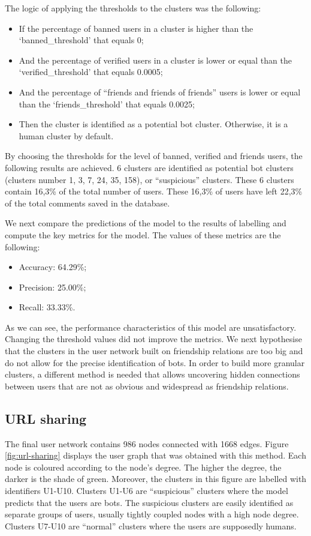 The logic of applying the thresholds to the clusters was the following:
\begin{itemize}
    \item If the percentage of banned users in a cluster is higher than the ‘banned\_threshold’ that equals 0;
    \item And the percentage of verified users in a cluster is lower or equal than
    the ‘verified\_threshold’ that equals 0.0005;
    \item And the percentage of ``friends and friends of friends'' users is lower or equal than the ‘friends\_threshold’ that equals 0.0025;
    \item Then the cluster is identified as a potential bot cluster. Otherwise, it is a human cluster by default.
\end{itemize}

By choosing the thresholds for the level of banned, verified and friends users,
the following results are achieved. 6 clusters are identified as potential bot clusters (clusters number 1, 3, 7, 24, 35, 158), or ``suspicious'' clusters. These 6 clusters contain 16,3\% of the total number of users. These 16,3\% of users have left 22,3\% of the total comments saved in the database.

We next compare the predictions of the model to the results of labelling and compute the key metrics for the model. The values of these metrics are the following:
\begin{itemize}
    \item Accuracy: 64.29\%;
    \item Precision: 25.00\%;
    \item Recall: 33.33\%.
\end{itemize}

As we can see, the performance characteristics of this model are unsatisfactory. Changing the threshold values did not improve the metrics. We next hypothesise that the clusters in the user network built on friendship relations are too big and do not allow for the precise identification of bots. In order to build more granular clusters, a different method is needed that allows uncovering hidden connections between users that are not as obvious and widespread as friendship relations.

\subsection{URL sharing}

The final user network contains 986 nodes connected with 1668 edges. Figure \ref{fig:url-sharing} displays the user graph that was obtained with this method. Each node is coloured according to the node's degree. The higher the degree, the darker is the shade of green. Moreover, the clusters in this figure are labelled with identifiers U1-U10. Clusters U1-U6 are ``suspicious'' clusters where the model predicts that the users are bots. The suspicious clusters are easily identified as separate groups of users, usually tightly coupled nodes with a high node degree. Clusters U7-U10 are ``normal'' clusters where the users are supposedly humans. 

